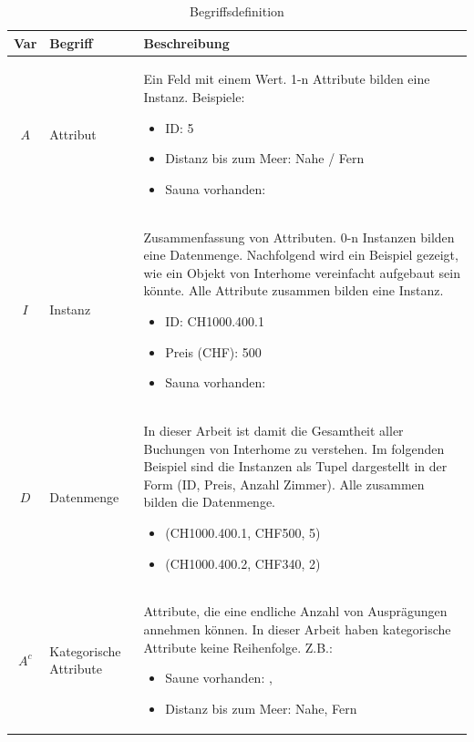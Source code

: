 \begin{table}[H] 
	\caption{Begriffsdefinition}
	\centering
	\label{fig:einletung:begriffsdefinition:1}
	\begin{tabular}{ | c | C{2.5cm} | p{10cm} |} 
		\hline 
		\bfseries Var & 
		\bfseries Begriff & 
		\bfseries Beschreibung \\ \hline 
		$A$ & Attribut & Ein Feld mit einem Wert. 1-n Attribute bilden eine Instanz. Beispiele:\
			\begin{itemize}
			\item ID: 5
			\item Distanz bis zum Meer: Nahe / Fern
			\item Sauna vorhanden: \checkmark
			\end{itemize} \\ \hline 
		$I$ & Instanz & Zusammenfassung von Attributen. 0-n Instanzen bilden eine Datenmenge. Nachfolgend wird ein Beispiel gezeigt, wie ein Objekt von Interhome vereinfacht aufgebaut sein könnte. Alle Attribute zusammen bilden eine Instanz.\
			\begin{itemize}
			\item ID: CH1000.400.1
			\item Preis (CHF): 500
			\item Sauna vorhanden: \checkmark
			\end{itemize} \\ \hline 
		$D$ & Datenmenge & In dieser Arbeit ist damit die Gesamtheit aller Buchungen von Interhome zu verstehen. Im folgenden Beispiel sind die Instanzen als Tupel dargestellt in der Form (ID, Preis, Anzahl Zimmer). Alle zusammen bilden die Datenmenge.\
			\begin{itemize}
			\item (CH1000.400.1, CHF500, 5)
			\item (CH1000.400.2, CHF340, 2)
			\end{itemize}\\ \hline 
		$A^c$ & Kategorische Attribute & Attribute, die eine endliche Anzahl von Ausprägungen annehmen können. In dieser Arbeit haben kategorische Attribute keine Reihenfolge. Z.B.: \
			\begin{itemize}
			\item Saune vorhanden: \checkmark, 
			\item Distanz bis zum Meer: Nahe, Fern

\end{itemize}
\end{tabular}
\end{table}
